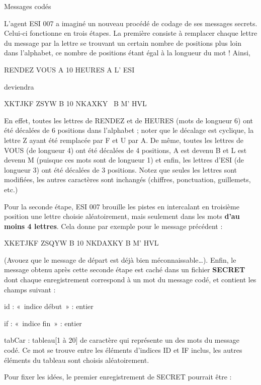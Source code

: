 \begin{Exercice}{Messages codés}

{
L'agent ESI 007 a imaginé un nouveau procédé de codage
de ses messages secrets. Celui-ci fonctionne en trois étapes. La
première consiste à remplacer chaque lettre du message par la lettre se
trouvant un certain nombre de positions plus loin dans l’alphabet, ce
nombre de positions étant égal à la longueur du mot ! Ainsi,}

{\centering
RENDEZ VOUS A 10 HEURES A L’ ESI
\par}

{
deviendra}

{\centering
XKTJKF ZSYW B 10 NKAXKY \ B M’ HVL
\par}

{
En effet, toutes les lettres de RENDEZ et de HEURES (mots de longueur 6)
ont été décalées de 6 positions dans l’alphabet ; noter que le décalage
est cyclique, la lettre Z ayant été remplacée par F et U par A. De
même, toutes les lettres de VOUS (de longueur 4) ont été décalées de 4
positions, A est devenu B et L est devenu M (puisque ces mots sont de
longueur 1) et enfin, les lettres d’ESI (de longueur 3) ont été
décalées de 3 positions. Notez que seules les lettres sont modifiées,
les autres caractères sont inchangés (chiffres, ponctuation,
guillemets, etc.)}

{
Pour la seconde étape, ESI 007 brouille les pistes en intercalant en
troisième position une lettre choisie aléatoirement, mais seulement
dans les mots \textbf{d’au moins 4 lettres}. Cela donne par exemple
pour le message précédent :}

{\centering
XKETJKF ZSQYW B 10 NKDAXKY B M’ HVL
\par}

{
(Avouez que le message de départ est déjà bien méconnaissable…). Enfin,
le message obtenu après cette seconde étape est caché dans un fichier
\textbf{SECRET} dont chaque enregistrement correspond à un mot du
message codé, et contient les champs suivant :}

\begin{liste}
\item {
id : «~indice début~» : entier}
\item {
if : «~indice fin~» : entier}
\item {
tabCar : tableau[1 à 20] de caractère qui représente un des mots du
message codé. Ce mot se trouve entre les éléments d’indices ID et IF
inclus, les autres éléments du tableau sont choisis aléatoirement.}
\end{liste}
{
Pour fixer les idées, le premier enregistrement de SECRET pourrait être
:}


\end{Exercice}
